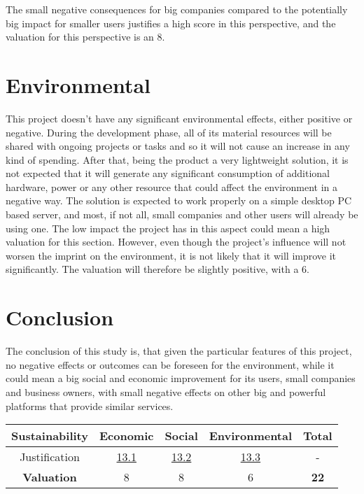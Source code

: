 The small negative consequences for big companies compared to the potentially big impact for smaller users justifies a high score in this perspective, and the valuation for this perspective is an 8.

\section{Environmental}
\label{sec:133}
This project doesn’t have any significant environmental effects, either positive or negative. During the development phase, all of its material resources will be shared with ongoing projects or tasks and so it will not cause an increase in any kind of spending. After that, being the product a very lightweight solution, it is not expected that it will generate any significant consumption of additional hardware, power or any other resource that could affect the environment in a negative way. The solution is expected to work properly on a simple desktop PC based server, and most, if not all, small companies and other users will already be using one. The low impact the project has in this aspect could mean a high valuation for this section. However, even though the project’s influence will not worsen the imprint on the environment, it is not likely that it will improve it significantly. The valuation will therefore be slightly positive, with a 6.

\section{Conclusion}
The conclusion of this study is, that given the particular features of this project, no negative effects or outcomes can be foreseen for the environment, while it could mean a big social and economic improvement for its users, small companies and business owners, with small negative effects on other big and powerful platforms that provide similar services.
\hfill\break
\begin{center}
    \begin{tabular}{ | c | c | c | c | c |}
    	\hline
 		\textbf{Sustainability} & Economic & Social & Environmental & \textbf{Total} \\ \hline
 		Justification & \hyperref[sec:131]{13.1} & \hyperref[sec:132]{13.2} & \hyperref[sec:133]{13.3} & - \\ \hline
 		\textbf{Valuation} & 8 & 8 & 6 & \textbf{22} \\ \hline
    \end{tabular}
\end{center}